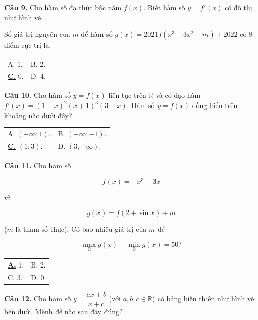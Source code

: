 \documentclass[12pt,a4paper]{article}
\makeatletter
\newcommand{\choiceA}[4]{

    \par\vspace{0.5em}\noindent

    \begin{tabularx}{\textwidth}{@{}X X@{}}

    \underline{\textbf{A.}} #1 & B. #2 \\[1.2em]

    C. #3 & D. #4

    \end{tabularx}

}
\newcommand{\choiceC}[4]{

    \par\vspace{0.5em}\noindent

    \begin{tabularx}{\textwidth}{@{}X X@{}}

    A. #1 & B. #2 \\[1.2em]

    \underline{\textbf{C.}} #3 & D. #4

    \end{tabularx}

}
\makeatother
\begin{document}
\textbf{Câu 9.} Cho hàm số đa thức bậc năm $f(x)$. Biết hàm số $y = f'(x)$ có đồ thị như hình vẽ.

\begin{center}


\end{center}

Số giá trị nguyên của $m$ để hàm số $g(x) = 2021f(x^3 - 3x^2 + m) + 2022$ có $8$ điểm cực trị là:

\choiceC{$1$.}{$2$.}{$0$.}{$4$.}



\textbf{Câu 10.} Cho hàm số $y=f(x)$ liên tục trên $\mathbb{R}$ và có đạo hàm $f'(x)=(1-x)^2(x+1)^3(3-x)$. Hàm số $y=f(x)$ đồng biến trên khoảng nào dưới đây?

\choiceC{$(-\infty; 1)$.}{$(-\infty; -1)$.}{$(1; 3)$.}{$(3; +\infty)$.}



\textbf{Câu 11.} Cho hàm số

\[

f(x) = -x^3 + 3x

\]

và

\[

g(x) = f(2 + \sin x) + m

\]

($m$ là tham số thực). Có bao nhiêu giá trị của $m$ để

\[

\max_{\mathbb{R}} g(x) + \min_{\mathbb{R}} g(x) = 50?

\]

\choiceA{$1$.}{$2$.}{$3$.}{$0$.}



\textbf{Câu 12.} Cho hàm số $y = \dfrac{ax+b}{x+c}$ (với $a, b, c \in \mathbb{R}$) có bảng biến thiên như hình vẽ bên dưới. Mệnh đề nào sau đây đúng?
\end{document}
